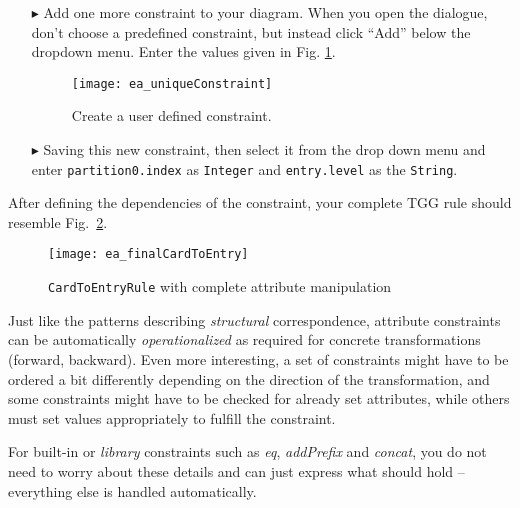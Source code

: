 \begin{enumerate}
\item[$\blacktriangleright$] Add one more constraint to your diagram. When you open the dialogue, don't choose a predefined constraint, but instead click
``Add'' below the dropdown menu. Enter the values given in Fig. \ref{fig:create_new_constraint}.

\vspace{0.5cm}

\begin{figure}[htbp]
\begin{center}
  \texttt{[image: ea\_uniqueConstraint]}
  \caption{Create a user defined constraint.}
  \label{fig:create_new_constraint}
\end{center}
\end{figure}
\FloatBarrier

\item[$\blacktriangleright$] Saving this new constraint, then select it from the drop down menu and enter \texttt{partition0.index} as \texttt{Integer} and
\texttt{entry.level} as the \texttt{String}.
\end{enumerate}

After defining the dependencies of the constraint, your complete TGG rule should resemble Fig.~\ref{fig:cardtoentry_complete}.

\begin{figure}[htbp]
\begin{center}
  \texttt{[image: ea\_finalCardToEntry]}
  \caption{\texttt{CardToEntryRule} with complete attribute manipulation}
  \label{fig:cardtoentry_complete}
\end{center}
\end{figure}

Just like the patterns describing \emph{structural} correspondence,  attribute constraints can be automatically \emph{operationalized} as required for  concrete
transformations (forward, backward). Even more interesting, a set of constraints might have to be ordered a bit differently depending on the direction of the
transformation, and some constraints might have to be checked for already set attributes, while others must set values appropriately to fulfill the constraint.

For built-in or \emph{library} constraints such as \emph{eq}, \emph{addPrefix} and \emph{concat}, you do not need to worry about these details and can just
express what should hold -- everything else is handled automatically.

